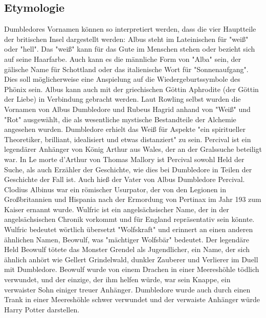\documentclass[a4paper, 10pt]{article}
\begin{document}
\subsection*{\Large Etymologie}
Dumbledores Vornamen können so interpretiert werden, dass die vier Hauptteile der britischen Insel dargestellt werden:
\vspace{10pt}
\newline
{}  
Albus steht im Lateinischen für "weiß" oder "hell". Das "weiß" kann für das Gute im Menschen stehen oder bezieht sich auf seine Haarfarbe. Auch kann es die männliche Form von "Alba" sein, der gälische Name für Schottland oder das italienische Wort für "Sonnenaufgang". Dies soll möglicherweise eine Anspielung auf die Wiedergeburtssymbole des Phönix sein. Albus kann auch mit der griechischen Göttin Aphrodite (der Göttin der Liebe) in Verbindung gebracht werden. Laut Rowling selbst wurden die Vornamen von Albus Dumbledore und Rubeus Hagrid anhand von "Weiß" und "Rot" ausgewählt, die als wesentliche mystische Bestandteile der Alchemie angesehen wurden. Dumbledore erhielt das Weiß für Aspekte "ein spiritueller Theoretiker, brilliant, idealisiert und etwas distanziert" zu sein.
\vspace{10pt}
\newline
{}  
Percival ist ein legendärer Anhänger von König Arthur aus Wales, der an der Gralssuche beteiligt war. In Le morte d'Arthur von Thomas Mallory ist Percival sowohl Held der Suche, als auch Erzähler der Geschichte, wie dies bei Dumbledore in Teilen der Geschichte der Fall ist. Auch hieß der Vater von Albus Dumbledore Percival.
\vspace{10pt}
\newline
{}  
Clodius Albinus war ein römischer Usurpator, der von den Legionen in Großbritannien und Hispania nach der Ermordung von Pertinax im Jahr 193 zum Kaiser ernannt wurde.
\vspace{10pt}
\newline
{}  
Wulfric ist ein angelsächsischer Name, der in der angelsächsischen Chronik vorkommt und für England repräsentativ sein könnte. Wulfric bedeutet wörtlich übersetzt "Wolfskraft" und erinnert an einen anderen ähnlichen Namen, Beowulf, was "mächtiger Wolfsbär" bedeutet. Der legendäre Held Beowulf tötete das Monster Grendel als Jugendlicher, ein Name, der sich ähnlich anhört wie Gellert Grindelwald, dunkler Zauberer und Verlierer im Duell mit Dumbledore. Beowulf wurde von einem Drachen in einer Meereshöhle tödlich verwundet, und der einzige, der ihm helfen würde, war sein Knappe, ein verwaister Sohn einiger treuer Anhänger. Dumbledore wurde auch durch einen Trank in einer Meereshöhle schwer verwundet und der verwaiste Anhänger würde Harry Potter darstellen.
\end{document}
